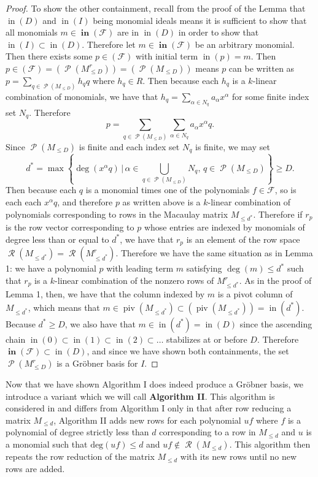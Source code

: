 \documentclass[11pt]{article}
\newcommand{\F}{\mathcal{F}}
\DeclareMathOperator{\Poly}{\mathscr{P}}
\DeclareMathOperator{\Row}{\mathscr{R}}
\DeclareMathOperator{\init}{in}
\DeclareMathOperator{\Init}{\mathbf{in}}
\DeclareMathOperator{\piv}{piv}
\theoremstyle{definition}
\begin{document}
\begin{proof}
	To show the other containment, recall from the proof of the Lemma that $\init(D)$ and $\init(I)$ being monomial ideals means it is sufficient to show that all monomials $m \in \Init(\F)$ are in $\init(D)$ in order to show that $\init(I) \subset \init(D)$. Therefore let $m \in \Init(\F)$ be an arbitrary monomial. Then there exists some $p \in (\F)$ with initial term $\init(p) = m$. Then $p \in (\F) = (\Poly(M_{\leq D}^r)) = (\Poly(M_{\leq D}))$ means $p$ can be written as $p = \sum_{q \in \Poly(M_{\leq D})} h_q q$ where $h_q \in R$. Then because each $h_q$ is a $k$-linear combination of monomials, we have that $h_q = \sum_{\alpha \in N_q} a_\alpha x^\alpha$ for some finite index set $N_q$. Therefore \[ p = \sum_{q \in \Poly(M_{\leq D})} \sum_{\alpha \in N_q} a_\alpha x^\alpha q. \] Since $\Poly(M_{\leq D})$ is finite and each index set $N_q$ is finite, we may set \[ d^* = \max \left\{\deg(x^\alpha q) \, \bigg| \, \alpha \in \bigcup_{q \in \Poly(M_{\leq D})} N_q, \, q \in \Poly(M_{\leq D}) \right\} \geq D. \] Then because each $q$ is a monomial times one of the polynomials $f \in \F$, so is each each $x^\alpha q$, and therefore $p$ as written above is a $k$-linear combination of polynomials corresponding to rows in the Macaulay matrix $M_{\leq d^*}$. Therefore if $r_p$ is the row vector corresponding to $p$ whose entries are indexed by monomials of degree less than or equal to $d^*$, we have that $r_p$ is an element of the row space $\Row(M_{\leq d^*}) = \Row(M_{\leq d^*}^r)$. Therefore we have the same situation as in Lemma 1: we have a polynomial $p$ with leading term $m$ satisfying $\deg(m) \leq d^*$ such that $r_p$ is a $k$-linear combination of the nonzero rows of $M_{\leq d^*}^r$. As in the proof of Lemma 1, then, we have that the column indexed by $m$ is a pivot column of $M_{\leq d^*}$, which means that $m \in \piv(M_{\leq d^*}) \subset (\piv(M_{\leq d^*})) = \init(d^*)$. Because $d^* \geq D$, we also have that $m \in \init(d^*) = \init(D)$ since the ascending chain $\init(0) \subset \init(1) \subset \init(2) \subset \dots$ stabilizes at or before $D$. Therefore $\Init(\F) \subset \init(D)$, and since we have shown both containments, the set $\Poly(M_{\leq D}^r)$ is a Gröbner basis for $I$. 
\end{proof}


Now that we have shown Algorithm I does indeed produce a Gröbner basis, we introduce a variant which we will call \textbf{Algorithm II}. This algorithm is considered in \cite{caminata2023solving} and differs from Algorithm I only in that after row reducing a matrix $M_{\leq d}$, Algorithm II adds new rows for each polynomial $uf$ where $f$ is a polynomial of degree strictly less than $d$ corresponding to a row in $M_{\leq d}$ and $u$ is a monomial such that $\text{deg}(uf) \leq d$ and $uf \notin \Row(M_{\leq d})$. This algorithm then repeats the row reduction of the matrix $M_{\leq d}$ with its new rows until no new rows are added. 
\end{document}
